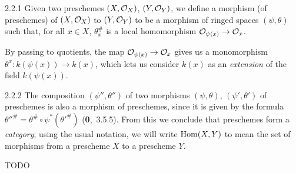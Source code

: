 \documentclass[../main.tex]{subfiles}
\begin{document}
\begin{cx}[Definition]{2.2.1}
    Given two preschemes $(X,\mathcal{O}_X)$, $(Y,\mathcal{O}_Y)$, we define a morphism (of preschemes) of $(X,\mathcal{O}_X)$ to $(Y,\mathcal{O}_Y)$ to be a morphism of ringed spaces $(\psi,\theta)$ such that, for all $x\in X$, $\theta_x^\#$ is a local homomorphism $\mathcal{O}_{\psi(x)}\to\mathcal{O}_x$.
\end{cx}

By passing to quotients, the map $\mathcal{O}_{\psi(x)}\to\mathcal{O}_x$ gives us a monomorphism $\theta^x\colon k(\psi(x))\to k(x)$, which lets us consider $k(x)$ as an \emph{extension} of the field $k(\psi(x))$.

\begin{cx}{2.2.2}
    The composition $(\psi'',\theta'')$ of two morphisms $(\psi,\theta)$, $(\psi',\theta')$ of preschemes is also a morphism of preschemes, since it is given by the formula $\theta''^\#=\theta^\#\circ\psi^*(\theta'^\#)$ (\textbf{0},~3.5.5).
    From this we conclude that preschemes form a \emph{category}; using the usual notation, we will write $\operatorname*{Hom}(X,Y)$ to mean the set of morphisms from a prescheme $X$ to a prescheme $Y$.
\end{cx}

TODO
\end{document}
